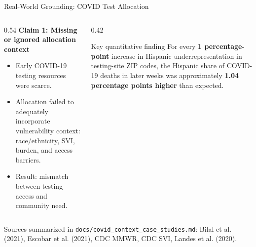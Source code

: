 \documentclass[aspectratio=169,10pt]{beamer}
\begin{document}
\begin{frame}{Real-World Grounding: COVID Test Allocation}
\begin{columns}[T]
\begin{column}{0.54\textwidth}
\textbf{Claim 1: Missing or ignored allocation context}
\begin{itemize}
    \item Early COVID-19 testing resources were scarce.
    \item Allocation failed to adequately incorporate vulnerability context: race/ethnicity, SVI, burden, and access barriers.
    \item Result: mismatch between testing access and community need.
\end{itemize}
\end{column}
\begin{column}{0.42\textwidth}
\begin{block}{Key quantitative finding}
For every \textbf{1 percentage-point} increase in Hispanic underrepresentation in testing-site ZIP codes, the Hispanic share of COVID-19 deaths in later weeks was approximately \textbf{1.04 percentage points higher} than expected.
\end{block}
\end{column}
\end{columns}

\vspace{0.6em}
\footnotesize Sources summarized in \texttt{docs/covid\_context\_case\_studies.md}: Bilal et al. (2021), Escobar et al. (2021), CDC MMWR, CDC SVI, Landes et al. (2020).
\end{frame}
\end{document}
